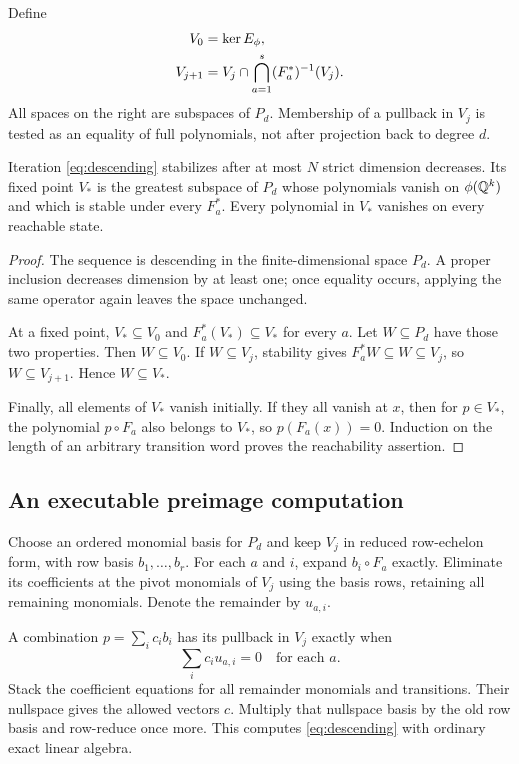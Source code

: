 Define
\begin{align}
 V_0&=\operatorname{ker} E_\phi,\label{eq:V0}\\
 V_{j+1}&=V_j\cap\bigcap_{a=1}^{s}(F_a^*)^{-1}(V_j).
 \label{eq:descending}
\end{align}
All spaces on the right are subspaces of $P_d$. Membership of a pullback in
$V_j$ is tested as an equality of full polynomials, not after projection back
to degree $d$.

\begin{theorem}\label{thm:space}
Iteration \eqref{eq:descending} stabilizes after at most $N$ strict dimension
decreases. Its fixed point $V_*$ is the greatest subspace of $P_d$ whose
polynomials vanish on $\phi(\mathbb{Q}^k)$ and which is stable under every $F_a^*$.
Every polynomial in $V_*$ vanishes on every reachable state.
\end{theorem}
\begin{proof}
The sequence is descending in the finite-dimensional space $P_d$. A proper
inclusion decreases dimension by at least one; once equality occurs, applying
the same operator again leaves the space unchanged.

At a fixed point, $V_*\subseteq V_0$ and $F_a^*(V_*)\subseteq V_*$ for every
$a$. Let $W\subseteq P_d$ have those two properties. Then $W\subseteq V_0$.
If $W\subseteq V_j$, stability gives $F_a^*W\subseteq W\subseteq V_j$, so
$W\subseteq V_{j+1}$. Hence $W\subseteq V_*$.

Finally, all elements of $V_*$ vanish initially. If they all vanish at $x$,
then for $p\in V_*$, the polynomial $p\circ F_a$ also belongs to $V_*$, so
$p(F_a(x))=0$. Induction on the length of an arbitrary transition word proves
the reachability assertion.
\end{proof}

\subsection{An executable preimage computation}

Choose an ordered monomial basis for $P_d$ and keep $V_j$ in reduced row-echelon
form, with row basis $b_1,\ldots,b_r$. For each $a$ and $i$, expand
$b_i\circ F_a$ exactly. Eliminate its coefficients at the pivot monomials of
$V_j$ using the basis rows, retaining all remaining monomials. Denote the
remainder by $u_{a,i}$.

A combination $p=\sum_i c_i b_i$ has its pullback in $V_j$ exactly when
\[
 \sum_i c_i u_{a,i}=0
 \quad\text{for each }a.
\]
Stack the coefficient equations for all remainder monomials and transitions.
Their nullspace gives the allowed vectors $c$. Multiply that nullspace basis by
the old row basis and row-reduce once more. This computes
\eqref{eq:descending} with ordinary exact linear algebra.

